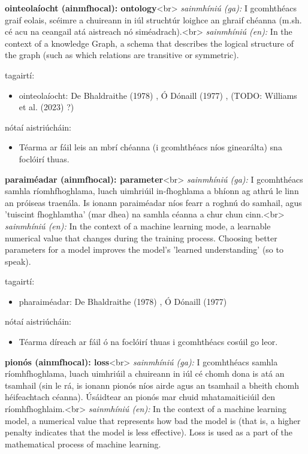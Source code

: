 \documentclass{article}
\begin{document}
\textbf{ointeolaíocht (ainmfhocal): ontology}<br>
\textit{sainmhíniú (ga):} I gcomhthéacs graif eolais, scéimre a chuireann in iúl struchtúr loighce an ghraif chéanna (m.sh. cé acu na ceangail atá aistreach nó siméadrach).<br>
\textit{sainmhíniú (en):} In the context of a knowledge Graph, a schema that describes the logical structure of the graph (such as which relations are transitive or symmetric).

tagairtí:
\begin{itemize}
	\item ointeolaíocht: De Bhaldraithe (1978) \cite{de-bhaldraithe}, Ó Dónaill (1977) \cite{odonaill}, (TODO: Williams et al. (2023) \cite{storchiste}?)
\end{itemize}

nótaí aistriúcháin:
\begin{itemize}
	\item Téarma ar fáil leis an mbrí chéanna (i gcomhthéacs níos ginearálta) sna foclóirí thuas.
\end{itemize}


\textbf{paraiméadar (ainmfhocal): parameter}<br>
\textit{sainmhíniú (ga):} I gcomhthéacs samhla ríomhfhoghlama, luach uimhriúil in-fhoghlama a bhíonn ag athrú le linn an próiseas traenála. Is ionann paraiméadar níos fearr a roghnú do samhail, agus 'tuiscint fhoghlamtha' (mar dhea) na samhla céanna a chur chun cinn.<br>
\textit{sainmhíniú (en):} In the context of a machine learning mode, a learnable numerical value that changes during the training process. Choosing better parameters for a model improves the model's 'learned understanding' (so to speak).

tagairtí:
\begin{itemize}
	\item pharaiméadar: De Bhaldraithe (1978) \cite{de-bhaldraithe}, Ó Dónaill (1977) \cite{odonaill}
\end{itemize}

nótaí aistriúcháin:
\begin{itemize}
	\item Téarma díreach ar fáil ó na foclóirí thuas i gcomhthéacs cosúil go leor.
\end{itemize}


\textbf{pionós (ainmfhocal): loss}<br>
\textit{sainmhíniú (ga):} I gcomhthéacs samhla ríomhfhoghlama, luach uimhriúil a chuireann in iúl cé chomh dona is atá an tsamhail (sin le rá, is ionann pionós níos airde agus an tsamhail a bheith chomh héifeachtach céanna). Úsáidtear an pionós mar chuid mhatamaiticiúil den ríomhfhoghlaim.<br>
\textit{sainmhíniú (en):} In the context of a machine learning model, a numerical value that represents how bad the model is (that is, a higher penalty indicates that the model is less effective). Loss is used as a part of the mathematical process of machine learning.
\end{document}
